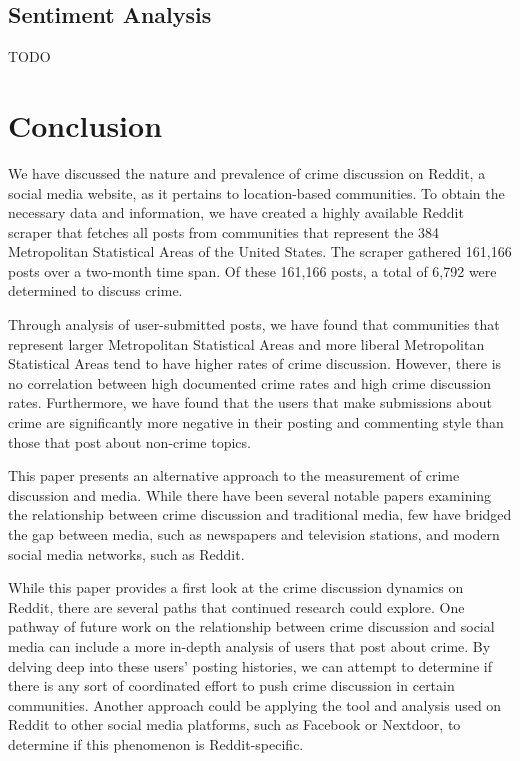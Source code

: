 \documentclass[12pt,oneside, letterpaper]{book}
\begin{document}
\section{Sentiment Analysis}

TODO

\chapter{Conclusion}

\par We have discussed the nature and prevalence of crime discussion on Reddit, a social media website, as it pertains to location-based communities. To obtain the necessary data and information, we have created a highly available Reddit scraper that fetches all posts from communities that represent the 384 Metropolitan Statistical Areas of the United States. The scraper gathered 161,166 posts over a two-month time span. Of these 161,166 posts, a total of 6,792 were determined to discuss crime. 

\par Through analysis of user-submitted posts, we have found that communities that represent larger Metropolitan Statistical Areas and more liberal Metropolitan Statistical Areas tend to have higher rates of crime discussion. However, there is no correlation between high documented crime rates and high crime discussion rates. Furthermore, we have found that the users that make submissions about crime are significantly more negative in their posting and commenting style than those that post about non-crime topics.

\par This paper presents an alternative approach to the measurement of crime discussion and media. While there have been several notable papers examining the relationship between crime discussion and traditional media, few have bridged the gap between media, such as newspapers and television stations, and modern social media networks, such as Reddit. 

\par While this paper provides a first look at the crime discussion dynamics on Reddit, there are several paths that continued research could explore. One pathway of future work on the relationship between crime discussion and social media can include a more in-depth analysis of users that post about crime. By delving deep into these users' posting histories, we can attempt to determine if there is any sort of coordinated effort to push crime discussion in certain communities. Another approach could be applying the tool and analysis used on Reddit to other social media platforms, such as Facebook or Nextdoor, to determine if this phenomenon is Reddit-specific.
\end{document}
